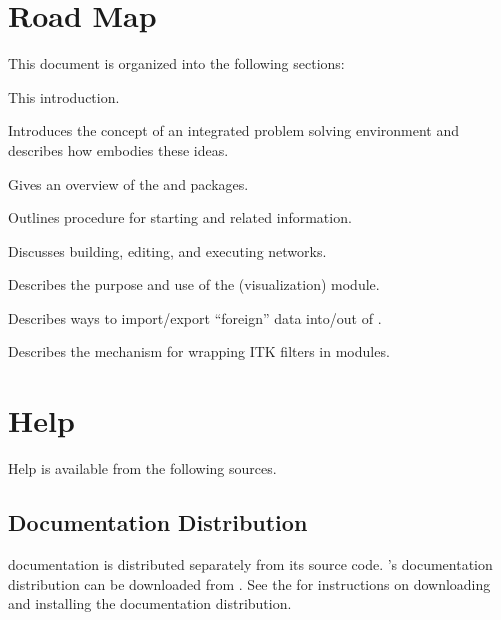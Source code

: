 
\section{Road Map}
\label{sec:roadmap}

This document is organized into the following sections:

\begin{description}
   This introduction.
  
   Introduces the concept of
  an integrated problem solving environment and describes how \SR{}
  embodies these ideas.
  
   Gives an overview
  of the \sr{} and \biopse{} packages.
  
   Outlines procedure
  for starting \sr{} and related information.

  Discusses building, editing, and executing
  networks.

  Describes the purpose and use of the \viewer{} (visualization) module.

  Describes ways to import/export ``foreign'' data into/out of \SR{}.

  Describes the mechanism for wrapping ITK filters in \sr{} modules.
\end{description}

\section{Help}
\label{sec:help}

Help is available from the following sources.

\subsection{Documentation Distribution}

\sr{} documentation is distributed separately from its source code.
\sr{}'s documentation distribution can be downloaded from
.  See the 
for instructions on downloading and installing the documentation
distribution.

